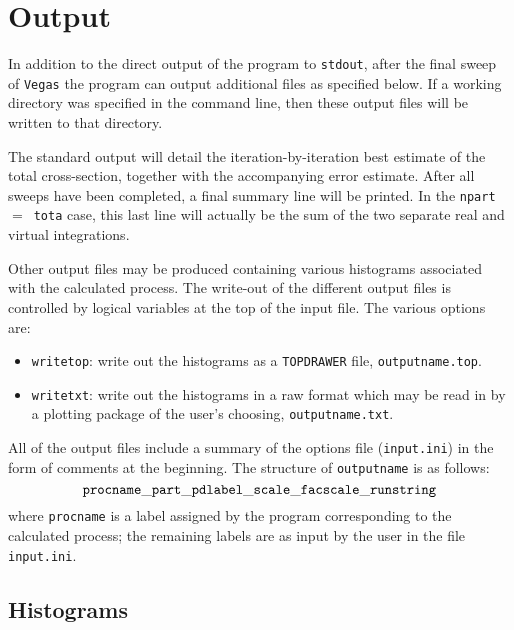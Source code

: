 \section{Output}
\label{sec:output}


In addition to the direct output of the program to {\tt stdout}, after
the final sweep of {\tt Vegas} the program can output additional files
as specified below.
If a working directory was specified in the command line, then these
output files will be written to that directory.

The standard output will detail the iteration-by-iteration best estimate
of the total cross-section, together with the accompanying error estimate.
After all sweeps have been completed, a final summary line will be printed.
In the {\tt npart}~$=$~{\tt tota} case, this last line will actually be the
sum of the two separate real and virtual integrations.

Other output files may be produced containing various histograms associated
with the calculated process. The write-out of the different output files
is controlled by logical variables at the top of the input file. The various options are:
\begin{itemize}
	\item {\tt writetop}:  write out the histograms as a {\tt TOPDRAWER} file,
	{\tt outputname.top}.
	\item {\tt writetxt}:  write out the histograms in a raw format 
	which may be read in by a plotting package of the user's choosing,
	{\tt outputname.txt}.
	
\end{itemize}

All of the output files include a summary of the options file ({\tt input.ini}) in the form of
comments at the beginning. The structure
of {\tt outputname} is as follows:
\begin{displaymath}
{\tt procname\_part\_pdlabel\_scale\_facscale\_runstring}
\end{displaymath}
where {\tt procname} is a label assigned by the program corresponding to
the calculated process; the remaining labels are as input by the user
in the file {\tt input.ini}.


\subsection{Histograms}
\label{sec:histos}

